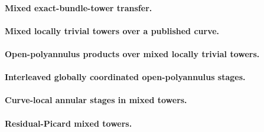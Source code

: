 \paragraph{Mixed exact-bundle-tower transfer.}



\paragraph{Mixed locally trivial towers over a published curve.}



\paragraph{Open-polyannulus products over mixed locally trivial towers.}



\paragraph{Interleaved globally coordinated open-polyannulus stages.}



\paragraph{Curve-local annular stages in mixed towers.}



\paragraph{Residual-Picard mixed towers.}


